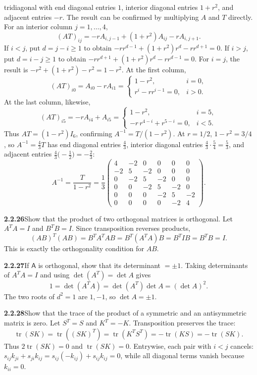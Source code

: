 tridiagonal with end diagonal entries $1$, interior diagonal entries
$1+r^2$, and adjacent entries $-r$.
The result can be confirmed by multiplying $A$ and $T$ directly.
For an interior column $j=1,\ldots,4$,
\[
(AT)_{ij}=-rA_{i,j-1}+(1+r^2)A_{ij}-rA_{i,j+1}.
\]
If $i<j$, put $d=j-i\ge1$ to obtain
$-r r^{d-1}+(1+r^2)r^d-r r^{d+1}=0$.
If $i>j$, put $d=i-j\ge1$ to obtain
$-r r^{d+1}+(1+r^2)r^d-r r^{d-1}=0$.
For $i=j$, the result is $-r^2+(1+r^2)-r^2=1-r^2$.
At the first column,
\[
(AT)_{i0}=A_{i0}-rA_{i1}
=\begin{cases}1-r^2,&i=0,\\r^i-r r^{i-1}=0,&i>0.\end{cases}
\]
At the last column, likewise,
\[
(AT)_{i5}=-rA_{i4}+A_{i5}
=\begin{cases}1-r^2,&i=5,\\-r\,r^{4-i}+r^{5-i}=0,&i<5.\end{cases}
\]
Thus $AT=(1-r^2)I_6$, confirming $A^{-1}=T/(1-r^2)$.
At $r=1/2$, $1-r^2=3/4$, so $A^{-1}=\frac43T$ has end diagonal
entries $\frac43$, interior diagonal entries $\frac43\cdot\frac54=\frac53$,
and adjacent entries $\frac43\bigl(-\frac12\bigr)=-\frac23$:
\[
\boxed{A^{-1}=\frac{T}{1-r^2}
=\frac13\begin{pmatrix}
4&-2&0&0&0&0\\
-2&5&-2&0&0&0\\
0&-2&5&-2&0&0\\
0&0&-2&5&-2&0\\
0&0&0&-2&5&-2\\
0&0&0&0&-2&4
\end{pmatrix}}.
\]

\par\bigskip
\noindent\textbf{2.2.26}\quad Show that the product of two orthogonal matrices
is orthogonal.
\solution
Let $A^TA=I$ and $B^TB=I$. Since transposition reverses products,
\[
(AB)^T(AB)=B^TA^TAB=B^T(A^TA)B=B^TIB=B^TB=I.
\]
This is exactly the orthogonality condition for $AB$.

\par\bigskip
\noindent\textbf{2.2.27}\quad If $\mathsf{A}$ is orthogonal, show that its
determinant $=\pm1$.
\solution
Taking determinants of $A^TA=I$ and using $\det(A^T)=\det A$ gives
\[
1=\det(A^TA)=\det(A^T)\det A=(\det A)^2.
\]
The two roots of $d^2=1$ are $1,-1$, so $\boxed{\det A=\pm1}$.

\par\bigskip
\noindent\textbf{2.2.28}\quad Show that the trace of the product of a
symmetric and an antisymmetric matrix is zero.
\solution
Let $S^T=S$ and $K^T=-K$. Transposition preserves the trace:
\[
\operatorname{tr}(SK)=\operatorname{tr}((SK)^T)
=\operatorname{tr}(K^TS^T)
=-\operatorname{tr}(KS)=-\operatorname{tr}(SK).
\]
Thus $2\operatorname{tr}(SK)=0$ and $\boxed{\operatorname{tr}(SK)=0}$.
Entrywise, each pair with $i<j$ cancels:
$s_{ij}k_{ji}+s_{ji}k_{ij}=s_{ij}(-k_{ij})+s_{ij}k_{ij}=0$,
while all diagonal terms vanish because $k_{ii}=0$.

